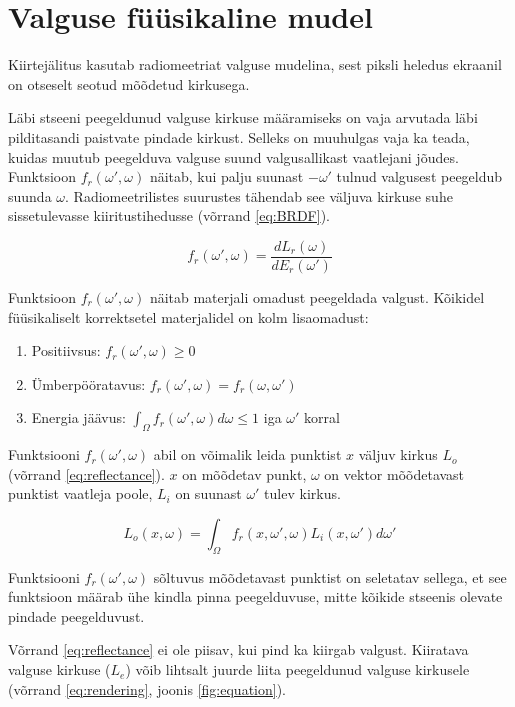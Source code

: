 \documentclass[a4paper,12pt]{report}
\begin{document}
\section{Valguse füüsikaline mudel}
Kiirtejälitus kasutab radiomeetriat valguse mudelina, sest piksli heledus
ekraanil on otseselt seotud mõõdetud kirkusega.

Läbi stseeni peegeldunud valguse kirkuse määramiseks on vaja arvutada
läbi pildi\-tasandi paistvate pindade kirkust. Selleks on muuhulgas vaja
ka teada, kuidas muutub peegelduva valguse suund valgusallikast vaatlejani
jõudes. Funktsioon \(f_r(\omega', \omega)\) näitab, kui palju suunast
\(-\omega'\) tulnud valgusest peegeldub suunda \(\omega\). Radiomeetrilistes
suurustes tähendab see väljuva kirkuse suhe sissetulevasse kiiritustihedusse
(võrrand \ref{eq:BRDF}).

\begin{equation} \label{eq:BRDF}
f_r(\omega', \omega) = \frac{dL_r(\omega)}{dE_r(\omega')}
\end{equation}

Funktsioon \(f_r(\omega', \omega)\) näitab materjali omadust peegeldada
valgust. Kõikidel füü\-si\-ka\-li\-selt korrektsetel materjalidel on kolm
lisaomadust:

\begin{enumerate}
\item Positiivsus: \(f_r(\omega', \omega) \geq 0 \)
\item Ümberpööratavus: \(f_r(\omega', \omega) = f_r(\omega, \omega')\)
\item Energia jäävus: \(\int_\Omega f_r(\omega', \omega) d\omega \leq 1\) iga \(\omega'\) korral
\end{enumerate}

Funktsiooni \(f_r(\omega', \omega)\) abil on võimalik leida punktist \(x\)
väljuv kirkus \(L_o\) (võrrand \ref{eq:reflectance}). \(x\) on mõõdetav
punkt, \(\omega\) on vektor mõõdetavast punktist vaatleja poole,
\(L_i\) on suunast \(\omega'\) tulev kirkus.

\begin{equation} \label{eq:reflectance}
L_o(x, \omega) = \int_\Omega f_r(x, \omega', \omega) L_i(x, \omega') d\omega'
\end{equation}

Funktsiooni \(f_r(\omega', \omega)\) sõltuvus mõõdetavast punktist on
seletatav sellega, et see funktsioon määrab ühe kindla pinna
peegelduvuse, mitte kõikide stseenis olevate pindade peegelduvust.

Võrrand \ref{eq:reflectance} ei ole piisav, kui pind ka kiirgab valgust.
Kiiratava valguse kirkuse (\(L_e\)) võib lihtsalt juurde liita peegeldunud valguse
kirkusele (võrrand \ref{eq:rendering}, joonis \ref{fig:equation}).
\end{document}
